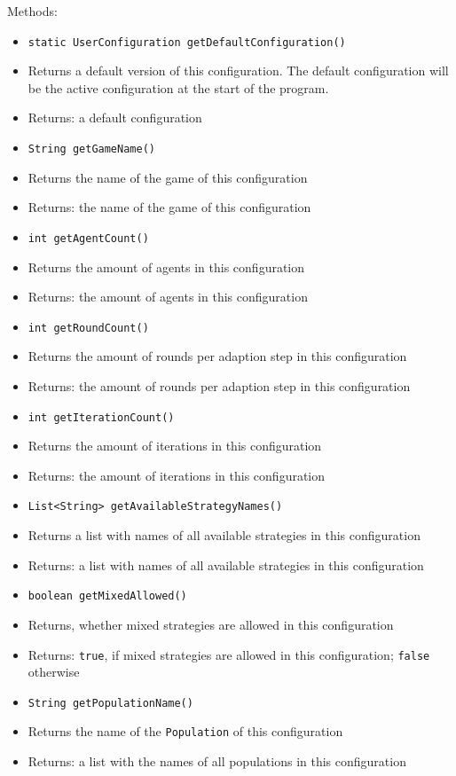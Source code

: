 \documentclass[parskip=full,11pt]{scrartcl}
\begin{document}
Methods:
\begin{itemize}\itemsep -10pt
	\item \texttt{static UserConfiguration getDefaultConfiguration()}
	\item[] Returns a default version of this configuration. The default configuration will be the active configuration at the start of the program.
	\item[] Returns: a default configuration

	\item \texttt{String getGameName()}
	\item[] Returns the name of the game of this configuration
	\item[] Returns: the name of the game of this configuration

	\item \texttt{int getAgentCount()}
	\item[] Returns the amount of agents in this configuration
	\item[] Returns: the amount of agents in this configuration

	\item \texttt{int getRoundCount()}
	\item[] Returns the amount of rounds per adaption step in this configuration
	\item[] Returns: the amount of rounds per adaption step in this configuration

	\item \texttt{int getIterationCount()}
	\item[] Returns the amount of iterations in this configuration
	\item[] Returns: the amount of iterations in this configuration

	\item \texttt{List<String> getAvailableStrategyNames()}
	\item[] Returns a list with names of all available strategies in this configuration
	\item[] Returns: a list with names of all available strategies in this configuration

	\item \texttt{boolean getMixedAllowed()}
	\item[] Returns, whether mixed strategies are allowed in this configuration
	\item[] Returns: \texttt{true}, if mixed strategies are allowed in this configuration; \texttt{false} otherwise

	\item \texttt{String getPopulationName()}
	\item[] Returns the name of the \texttt{Population} of this configuration
	\item[] Returns: a list with the names of all populations in this configuration


\end{itemize}
\end{document}
